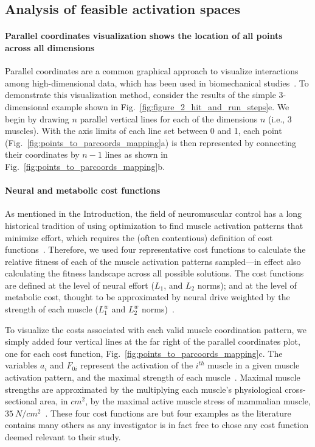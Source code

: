 \documentclass[9pt,twocolumn,twoside,lineno]{pnas-new}
\begin{document}
{\subsection*{Analysis of feasible activation spaces}
\paragraph*{Parallel coordinates visualization shows the location of all points across all dimensions}

Parallel coordinates are a common graphical approach to visualize interactions among high-dimensional data, which has been used in biomechanical studies~\cite{bachynskyi2013biomechanical, krekel2010visual}.
To demonstrate this visualization method, consider the results of the simple 3-dimensional example shown in Fig.~\ref{fig:figure_2_hit_and_run_steps}e. We begin by drawing $n$ parallel vertical lines for each of the dimensions $n$ (i.e., 3 muscles).
With the axis limits of each line set between 0 and 1, each point (Fig.~\ref{fig:points_to_parcoords_mapping}a) is then represented by connecting their coordinates by $n-1$ lines as shown in Fig.~\ref{fig:points_to_parcoords_mapping}b.

\paragraph*{Neural and metabolic cost functions}

As mentioned in the Introduction, the field of neuromuscular control has a long historical tradition of using optimization to find muscle activation patterns that minimize effort, which requires the (often contentious) definition of cost functions~\cite{spoor1983balancing,Chao1978Graphical,Prilutsky2000Muscle,crowninshield1981physiologically}. Therefore, we used four representative cost functions to calculate the relative fitness of each of the muscle activation patterns sampled---in effect also calculating the fitness landscape across all possible solutions. The cost functions are defined at the level of neural effort ($L_1$, and $L_2$ norms); and at the level of metabolic cost, thought to be approximated by neural drive weighted by the strength of each muscle ($L_1^w$ and $L_2^w$ norms)~\cite{Prilutsky2000Muscle,crowninshield1981physiologically}.

To visualize the costs associated with each valid muscle coordination pattern, we simply added four vertical lines at the far right of the parallel coordinates plot, one for each cost function, Fig.~\ref{fig:points_to_parcoords_mapping}c. The variables $a_i$ and $F_{0i}$ represent the activation of the $i^{th}$ muscle in a given muscle activation pattern, and the maximal strength of each muscle~\cite{Prilutsky2000Muscle,crowninshield1981physiologically}. Maximal muscle strengths are approximated by the multiplying each muscle's physiological cross-sectional area, in $cm^2$, by the maximal active muscle stress of mammalian muscle, $35~N/{cm^2}$~\cite{Zajac1993Muscle}. These four cost functions are but four examples as the literature contains many others as any investigator is in fact free to chose any cost function deemed relevant to their study.


}
\end{document}
